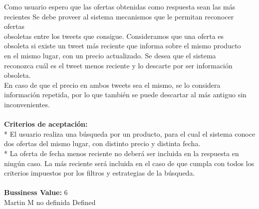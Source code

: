 \vspace{20pt}

	{Como usuario espero que las ofertas obtenidas como respuesta sean las más recientes} %
	{Se debe proveer al sistema mecanismos que le permitan reconocer ofertas\\
obsoletas entre los tweets que consigue. Consideramos que una oferta es\\
obsoleta si existe un tweet más reciente que informa sobre el mismo producto\\
en el mismo lugar, con un precio actualizado. Se desea que el sistema\\
reconozca cuál es el tweet menos reciente y lo descarte por ser información\\
obsoleta.\\
En caso de que el precio en ambos tweets sea el mismo, se lo considera\\
información repetida, por lo que también se puede descartar al más antiguo sin\\
inconvenientes.\\
  \\
\textbf{Criterios de aceptación:}\\
* El usuario realiza una búsqueda por un producto, para el cual el sistema conoce dos ofertas del mismo lugar, con distinto precio y distinta fecha.  \\
* La oferta de fecha menos reciente no deberá ser incluida en la respuesta en ningún caso. La más reciente será incluida en el caso de que cumpla con todos los criterios impuestos por los filtros y estrategias de la búsqueda. \\
  \\
\textbf{Bussiness Value:} 6\\
} %
	{} %
	{} %
	{Martin M} %
	{no definida} %
	{Defined} %


\vspace{20pt}

